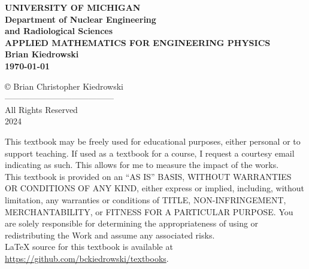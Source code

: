 
\thispagestyle{empty}
\begin{center}
\vspace*{1.4in}
{\LARGE  {\bf UNIVERSITY OF MICHIGAN   \vspace*{0.7in} \\   
   Department of Nuclear Engineering \\ and Radiological Sciences
      \vspace*{0.7in} \\

   APPLIED MATHEMATICS FOR ENGINEERING PHYSICS \vspace*{0.7in} \\
   Brian Kiedrowski }} \\
    \vspace{1cm} {\bf \today}
\end{center}
\pagebreak


\setcounter{page}{1}
\setcounter{chapter}{0}

 \begin{center}
 \copyright \; {\large Brian Christopher Kiedrowski \\
 --------------------------------------- \\
 All Rights Reserved \\
 2024 }
 \end{center}
 
 \vspace*{3em}
\noindent \small This textbook may be freely used for educational purposes, either personal or to support teaching. If used as a textbook for a course, I request a courtesy email indicating as such. This allows for me to measure the impact of the works. \\

\noindent  This textbook is provided on an ``AS IS'' BASIS, WITHOUT WARRANTIES OR CONDITIONS OF ANY KIND, either express or implied, including, without limitation, any warranties or conditions of TITLE, NON-INFRINGEMENT, MERCHANTABILITY, or FITNESS FOR A PARTICULAR PURPOSE. You are solely responsible for determining the appropriateness of using or redistributing the Work and assume any associated risks. \\

\noindent LaTeX source for this textbook is available at \\ \url{https://github.com/bckiedrowski/textbooks}. \\

